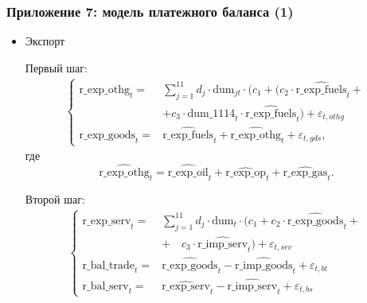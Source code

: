 \documentclass[9pt]{beamer}
\newcommand{\lsum}{\sum\limits}
\begin{document}
\begin{frame}
	\frametitle{Приложение 7: модель платежного баланса (1)}
	\footnotesize
	\begin{itemize}
		\item Экспорт
		
		Первый шаг:
		\begin{align*}
		\begin{cases}        
		\text{r\_exp\_othg}_t =& \lsum_{j = 1}^{11} d_j \cdot \text{dum}_{jt} \cdot (c_1 +
		(c_2 \cdot \widehat{\text{r\_exp\_fuels}}_t +  \\
		& + c_3 \cdot \text{dum\_1114}_t \cdot \widehat{\text{r\_exp\_fuels}}_t) + 
		\varepsilon_{t, othg} \\
		\text{r\_exp\_goods}_t =& \widehat{\text{r\_exp\_fuels}}_t + \widehat{\text{r\_exp\_othg}}_t + \varepsilon_{t, gds},
		\end{cases}
		\end{align*}
		где 
		\[
		\widehat{\text{r\_exp\_othg}}_t =\widehat{\text{r\_exp\_oil}}_t + \widehat{\text{r\_exp\_op}}_t + \widehat{\text{r\_exp\_gas}}_t.
		\]
		
		Второй шаг:
		\begin{align*}	
		\begin{cases}        
		\text{r\_exp\_serv}_t =& \lsum_{j = 1}^{11} d_j \cdot \text{dum}_t \cdot (c_1 + c_2 \cdot \widehat{\text{r\_exp\_goods}}_t + \\ &
		+ \quad c_3 \cdot \widehat{\text{r\_imp\_serv}}_t) + \varepsilon_{t, srv}\\
		\text{r\_bal\_trade}_t =& \widehat{\text{r\_exp\_goods}}_t - \widehat{\text{r\_imp\_goods}}_t + \varepsilon_{t, bt}\\
		\text{r\_bal\_serv}_t =& \widehat{\text{r\_exp\_serv}}_t - \widehat{\text{r\_imp\_serv}}_t + \varepsilon_{t, bs}
		\end{cases}
		\end{align*}

	\end{itemize}
\end{frame}
\end{document}
